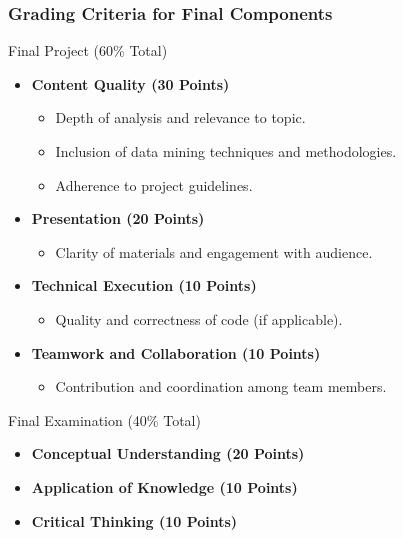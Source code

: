 \documentclass[aspectratio=169]{beamer}
\begin{document}
\begin{frame}[fragile]
    \frametitle{Grading Criteria for Final Components}
    \begin{block}{Final Project (60\% Total)}
        \begin{itemize}
            \item \textbf{Content Quality (30 Points)}
                \begin{itemize}
                    \item Depth of analysis and relevance to topic.
                    \item Inclusion of data mining techniques and methodologies.
                    \item Adherence to project guidelines.
                \end{itemize}
            \item \textbf{Presentation (20 Points)}
                \begin{itemize}
                    \item Clarity of materials and engagement with audience.
                \end{itemize}
            \item \textbf{Technical Execution (10 Points)}
                \begin{itemize}
                    \item Quality and correctness of code (if applicable).
                \end{itemize}
            \item \textbf{Teamwork and Collaboration (10 Points)}
                \begin{itemize}
                    \item Contribution and coordination among team members.
                \end{itemize}
        \end{itemize}
    \end{block}

    \begin{block}{Final Examination (40\% Total)}
        \begin{itemize}
            \item \textbf{Conceptual Understanding (20 Points)}
            \item \textbf{Application of Knowledge (10 Points)}
            \item \textbf{Critical Thinking (10 Points)}
        \end{itemize}
    \end{block}
\end{frame}
\end{document}
